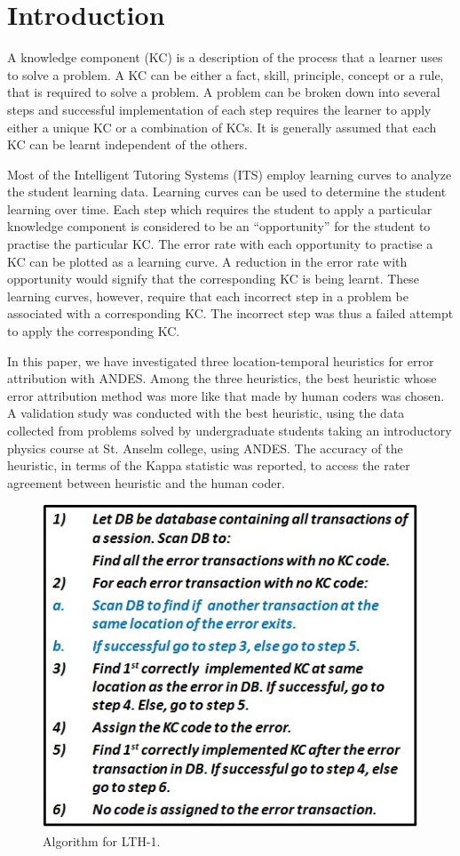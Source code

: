 \documentclass[conference]{IEEEtran}
\begin{document}
\section{Introduction}
A knowledge component (KC) is a description of the process that a learner uses to solve a problem. A KC can be either a fact, skill, principle, concept or a rule, that is required to solve a problem. A problem can be broken down into several steps and successful implementation of each step requires the learner to apply either a unique KC or a combination of KCs. It is generally assumed that each KC can be learnt independent of the others.

Most of the Intelligent Tutoring Systems (ITS) employ learning curves to analyze the student learning data. Learning curves can be used to determine the student learning over time. Each step which requires the student to apply a particular knowledge component is considered to be an ``opportunity'' for the student to practise the particular KC. The error rate with each opportunity to practise a KC can be plotted as a learning curve. A reduction in the error rate with opportunity would signify that the corresponding KC is being learnt. These learning curves, however, require that each incorrect step in a problem be associated with a corresponding KC. The incorrect step was thus a failed attempt to apply the corresponding KC.

In this paper, we have investigated three location-temporal heuristics for error attribution with ANDES. Among the three heuristics, the best heuristic whose error attribution method was more like that made by human coders was chosen. A validation study was conducted with the best heuristic, using the data collected from problems solved by undergraduate students taking an introductory physics course at St. Anselm college, using ANDES. The accuracy of the heuristic, in terms of the  Kappa statistic was reported, to access the rater agreement between heuristic and the human coder.

\begin{figure}
\centering
\includegraphics[scale=0.7]{LTH-1.jpg}
\caption{Algorithm for LTH-1.}
\label{LTH-1}
\end{figure}
\end{document}
